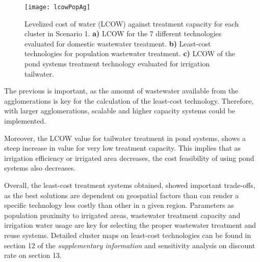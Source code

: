 \begin{figure}[!h]
	\centering
	\texttt{[image: lcowPopAg]}
	\caption{Levelized cost of water (LCOW) against treatment capacity for each cluster in Scenario 1. \textbf{a)} LCOW for the 7 different technologies evaluated for domestic wastewater treatment. \textbf{b)} Least-cost technologies for population wastewater treatment. \textbf{c)} LCOW of the pond systems treatment technology evaluated for irrigation tailwater.}
	\label{fig:lcowbaseline}
\end{figure}



The previous is important, as the amount of wastewater available from the agglomerations is key for the calculation of the least-cost technology. Therefore, with larger agglomerations, scalable and higher capacity systems could be implemented. 

Moreover, the LCOW value for tailwater treatment in pond systems, shows a steep increase in value for very low treatment capacity. This implies that as irrigation efficiency or irrigated area decreases, the cost feasibility of using pond systems also decreases.

Overall, the least-cost treatment systems obtained, showed important trade-offs, as the best solutions are dependent on geospatial factors than can render a specific technology less costly than other in a given region. Parameters as population proximity to irrigated areas, wastewater treatment capacity and irrigation water usage are key for selecting the proper wastewater treatment and reuse systems. Detailed cluster maps on least-cost technologies can be found in section 12 of the \textit{supplementary information} and sensitivity analysis on discount rate on section 13.

